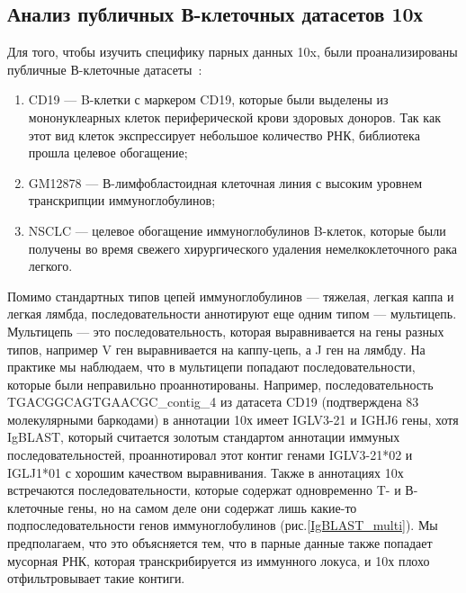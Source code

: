 \documentclass{spbau-diploma}
\begin{document}
\subsection{Анализ публичных В-клеточных датасетов 10х}

Для того, чтобы изучить специфику парных данных 10x, были проанализированы публичные В-клеточные датасеты~\cite{10x_datasets}: 
\begin{enumerate}
    \item CD19 --- B-клетки с маркером CD19, которые были выделены из мононуклеарных клеток периферической крови здоровых доноров.
    Так как этот вид клеток экспрессирует небольшое количество РНК, библиотека прошла целевое обогащение;
    \item GM12878 --- В-лимфобластоидная клеточная линия с высоким уровнем транскрипции иммуноглобулинов;
    \item NSCLC --- целевое обогащение иммуноглобулинов B-клеток, которые были получены во время свежего хирургического удаления немелкоклеточного рака легкого.
\end{enumerate}

Помимо стандартных типов цепей иммуноглобулинов --- тяжелая, легкая каппа и легкая лямбда, последовательности аннотируют еще одним типом --- мультицепь.
Мультицепь --- это последовательность, которая выравнивается на гены разных типов, например V ген выравнивается на каппу-цепь, а J ген на лямбду.
На практике мы наблюдаем, что в мультицепи попадают последовательности, которые были неправильно проаннотированы.
Например, последовательность TGACGGCAGTGAACGC\_contig\_4 из датасета CD19 (подтверждена $83$ молекулярными баркодами) в аннотации 10х имеет IGLV3-21 и IGHJ6 гены, хотя IgBLAST, который считается золотым стандартом аннотации иммуных последовательностей, проаннотировал этот контиг генами IGLV3-21*02 и IGLJ1*01 с хорошим качеством выравнивания.
Также в аннотациях 10х встречаются последовательности, которые содержат одновременно T- и В-клеточные гены, но на самом деле они содержат лишь какие-то подпоследовательности генов иммуноглобулинов (рис.\ref{IgBLAST_multi}).
Мы предполагаем, что это объясняется тем, что в парные данные также попадает мусорная РНК, которая транскрибируется из иммунного локуса, и 10х плохо отфильтровывает такие контиги.
\end{document}
